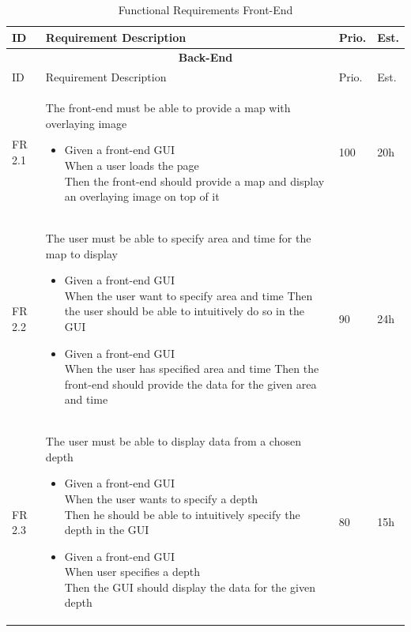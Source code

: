 \documentclass[11pt,a4paper,titlepage,oneside]{report}
\begin{document}
  \begin{longtable}{p{1.4cm} p{7.8cm} p{1cm} p{1cm} }
  \caption[]{Functional Requirements Front-End} \\
  \hline \hline
  \multicolumn{1}{p{1.4cm}}{ID} &
  \multicolumn{1}{p{7.8cm}}{Requirement Description} &
  \multicolumn{1}{p{1cm}}{Prio.} &
  \multicolumn{1}{p{1cm}}{Est.}
  \endhead

  \caption[Functional Requirements Front-End]{} \label{funcReqsFront} \\
  \hline \multicolumn{4}{c}{\textbf{Back-End}} \\
  \multicolumn{1}{p{1.4cm}}{ID} &
  \multicolumn{1}{p{7.8cm}}{Requirement Description} &
  \multicolumn{1}{p{1cm}}{Prio.} &
  \multicolumn{1}{p{1cm}}{Est.}
  \endfirsthead

  \hline
  \multicolumn{4}{r}{{Continued on next page}} \\
  \endfoot

  \hline \hline
  \endlastfoot
  
  \hline
  FR 2.1 & The front-end must be able to provide a map with overlaying image
  \begin{itemize}
  \item \parbox[t]{6.8cm}{
        Given a front-end GUI \\
        When a user loads the page \\
        Then the front-end should provide a map and display an overlaying image on top of it}
  \end{itemize}
  & 100 & 20h \\ \hline

  FR 2.2 & The user must be able to specify area and time for the map to display
  \begin{itemize}
  \item \parbox[t]{6.8cm}{
        Given a front-end GUI \\
        When the user want to specify area and time
        Then the user should be able to intuitively do so in the GUI}
  \item \parbox[t]{6.8cm}{
        Given a front-end GUI \\
        When the user has specified area and time
        Then the front-end should provide the data for the given area and time}
  \end{itemize}
  & 90 & 24h \\ \hline

  FR 2.3 & The user must be able to display data from a chosen depth
  \begin{itemize}
  \item \parbox[t]{6.8cm}{
        Given a front-end GUI \\
        When the user wants to specify a depth \\
        Then he should be able to intuitively specify the depth in the GUI}
  \item \parbox[t]{6.8cm}{
        Given a front-end GUI \\
        When user specifies a depth \\
        Then the GUI should display the data for the given depth}
  \end{itemize}
  & 80 & 15h \\ \hline


\end{longtable}
\end{document}
